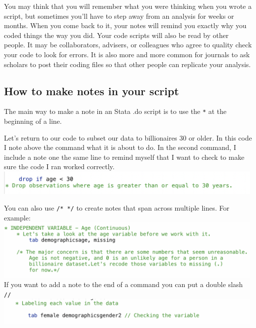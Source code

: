 \documentclass[
]{book}
\begin{document}
You may think that you will remember what you were thinking when you wrote a script, but sometimes you'll have to step away from an analysis for weeks or months. When you come back to it, your notes will remind you exactly why you coded things the way you did. Your code scripts will also be read by other people. It may be collaborators, advisers, or colleagues who agree to quality check your code to look for errors. It is also more and more common for journals to ask scholars to post their coding files so that other people can replicate your analysis.

\hypertarget{how-to-make-notes-in-your-script}{%
\subsection*{How to make notes in your script}\label{how-to-make-notes-in-your-script}}

The main way to make a note in an Stata .do script is to use the \texttt{*} at the beginning of a line.

Let's return to our code to subset our data to billionaires 30 or older. In this code I note above the command what it is about to do. In the second command, I include a note one the same line to remind myself that I want to check to make sure the code I ran worked correctly.
\includegraphics[width=5.20833in,height=\textheight]{images/notes1.png}

You can also use \texttt{/*\ */} to create notes that span across multiple lines. For example:
\includegraphics[width=5.20833in,height=\textheight]{images/notes2.png}
If you want to add a note to the end of a command you can put a double slash \texttt{//}
\includegraphics[width=5.20833in,height=\textheight]{images/notes3.png}
\end{document}
